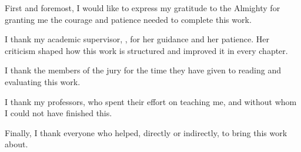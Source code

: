 
First and foremost, I would like to express my gratitude to the Almighty for granting me the
courage and patience needed to complete this work.

I thank my academic supervisor, \supervisorname, for her guidance and her patience. Her criticism
shaped how this work is structured and improved it in every chapter.

I thank the members of the jury for the time they have given to reading and evaluating this work.

I thank my professors, who spent their effort on teaching me, and without whom I could not have
finished this.

Finally, I thank everyone who helped, directly or indirectly, to bring this work about.

\vfill
